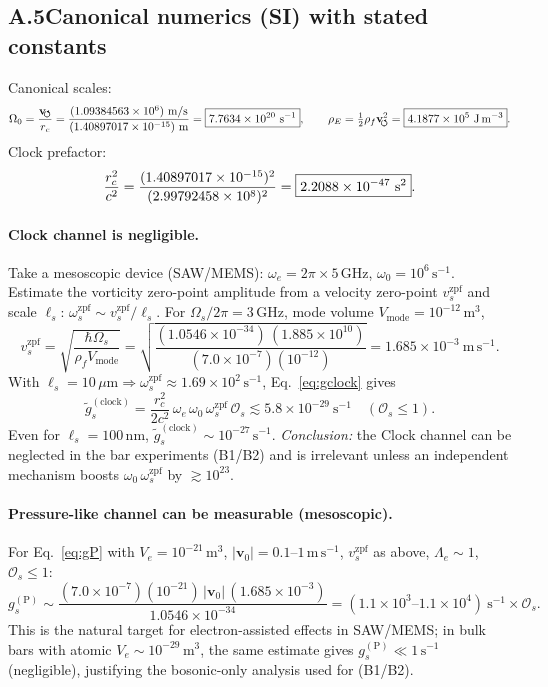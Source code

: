 \documentclass[aps,prb,preprint,amsmath,amssymb]{revtex4-2} %
\newcommand{\vswirlVal}{1.09384563\times10^{6}} %
\newcommand{\rcVal}{1.40897017\times10^{-15}} %
\newcommand{\vswirl}{\mathbf{v}_{\!\mkern-2mu\scriptstyle\boldsymbol{\circlearrowleft}}}
\newcommand{\rc}{r_c}
\newcommand{\rhoF}{\rho_{f}}
\newcommand{\rhoE}{\rho_{E}}
\begin{document}
    \subsection*{A.5\quad Canonical numerics (SI) with stated constants}
    Canonical scales:
    \[
        \OmegaZero=\frac{\vswirl}{\rc}
        =\frac{(\vswirlVal)\ \mathrm{m/s}}{(\rcVal)\ \mathrm{m}}
        =\boxed{7.7634\times10^{20}\ \mathrm{s^{-1}}},
        \qquad
        \rhoE=\tfrac12\rhoF\vswirl^2
        =\boxed{4.1877\times10^{5}\ \mathrm{J\,m^{-3}}}.
    \]
    Clock prefactor:
    \[
        \frac{\rc^2}{c^2}
        =\frac{(\rcVal)^2}{(\cVal)^2}
        =\boxed{2.2088\times10^{-47}\ \mathrm{s^2}}.
    \]

    \paragraph*{Clock channel is negligible.}
        Take a mesoscopic device (SAW/MEMS): \(\omega_e=2\pi\times 5\,\mathrm{GHz}\), \(\omega_0=10^{6}\,\mathrm{s^{-1}}\).
        Estimate the vorticity zero-point amplitude from a velocity zero-point \(v_{s}^\textrm{zpf}\) and scale \(\ell_s\): \(\omega_{s}^\textrm{zpf}\sim v_{s}^\textrm{zpf}/\ell_s\).
        For \(\Omega_s/2\pi=3\,\mathrm{GHz}\), mode volume \(V_\textrm{mode}=10^{-12}\,\mathrm{m^3}\),
        \[
            v_{s}^\textrm{zpf}=
            \sqrt{\frac{\hbar \Omega_s}{\rhoF V_\textrm{mode}}}
            =\sqrt{\frac{(1.0546\times10^{-34})\,(1.885\times10^{10})}{(7.0\times10^{-7})(10^{-12})}}
            =\boxed{1.685\times10^{-3}\ \mathrm{m\,s^{-1}}}.
        \]
        With \(\ell_s=10\,\mu\mathrm m\Rightarrow \omega_{s}^\textrm{zpf}\approx 1.69\times10^{2}\,\mathrm{s^{-1}}\), Eq.~\eqref{eq:gclock} gives
        \[
            \tilde g_{s}^{(\text{clock})}
            =\frac{\rc^2}{2c^2}\,\omega_e\,\omega_0\,\omega_{s}^\textrm{zpf}\,\mathcal O_s
            \lesssim \boxed{5.8\times10^{-29}\ \mathrm{s^{-1}}}\quad(\mathcal O_s\le 1).
        \]
        Even for \(\ell_s=100\,\mathrm{nm}\), \(\tilde g_{s}^{(\text{clock})}\sim 10^{-27}\,\mathrm{s^{-1}}\). \emph{Conclusion:} the Clock channel can be neglected in the bar experiments (B1/B2) and is irrelevant unless an independent mechanism boosts \(\omega_0\,\omega_{s}^\textrm{zpf}\) by \(\gtrsim 10^{23}\).

    \paragraph*{Pressure-like channel can be measurable (mesoscopic).}
        For Eq.~\eqref{eq:gP} with \(V_e=10^{-21}\,\mathrm{m^3}\), \(|\mathbf v_0|=0.1\text{–}1\,\mathrm{m\,s^{-1}}\), \(v_{s}^\textrm{zpf}\) as above, \(\Lambda_e\sim 1\), \(\mathcal O_s\le 1\):
        \[
            g_s^{(\mathrm P)}\sim \frac{(7.0\times10^{-7})(10^{-21})\,|\mathbf v_0|\,(1.685\times10^{-3})}{1.0546\times10^{-34}}
            =\boxed{(1.1\times10^{3}\text{–}1.1\times10^{4})\ \mathrm{s^{-1}}}\times \mathcal O_s.
        \]
        This is the natural target for electron-assisted effects in SAW/MEMS; in bulk bars with atomic \(V_e\sim10^{-29}\,\mathrm{m^3}\), the same estimate gives \(g_s^{(\mathrm P)}\ll 1\,\mathrm{s^{-1}}\) (negligible), justifying the bosonic-only analysis used for (B1/B2).
\end{document}
